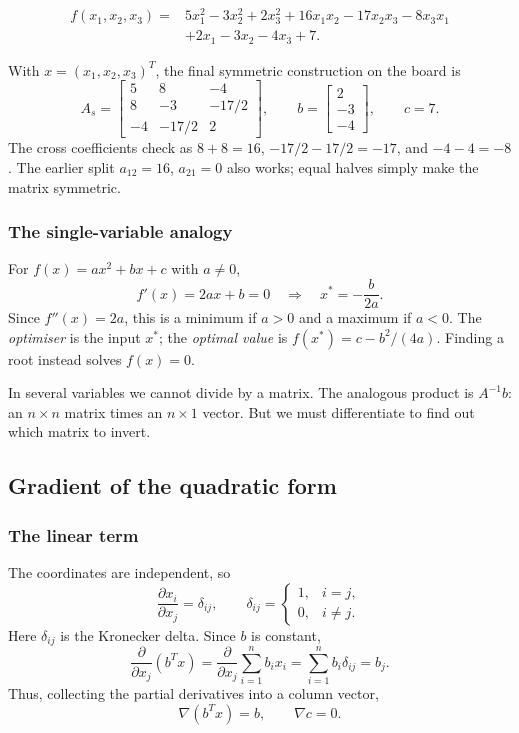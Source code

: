 \begin{example}\label{ex:lec10-three}
	\[
		\begin{aligned}
			f(x_1,x_2,x_3)={} & 5x_1^2-3x_2^2+2x_3^2
			+16x_1x_2-17x_2x_3-8x_3x_1               \\
			                  & +2x_1-3x_2-4x_3+7.
		\end{aligned}
	\]
\end{example}
With $x=(x_1,x_2,x_3)^T$, the final symmetric construction on the board is
\[
	A_s=\begin{bmatrix}
		5 & 8 & -4 \\8&-3&-17/2\\-4&-17/2&2
	\end{bmatrix},\qquad
	b=\begin{bmatrix}2\\-3\\-4\end{bmatrix},\qquad c=7.
\]
The cross coefficients check as $8+8=16$, $-17/2-17/2=-17$, and $-4-4=-8$. The earlier split $a_{12}=16$, $a_{21}=0$ also works; equal halves simply make the matrix symmetric.

\subsubsection*{The single-variable analogy}
For $f(x)=ax^2+bx+c$ with $a\ne0$,
\[
	f'(x)=2ax+b=0\quad\Longrightarrow\quad x^*=-\frac{b}{2a}.
\]
Since $f''(x)=2a$, this is a minimum if $a>0$ and a maximum if $a<0$. The \emph{optimiser} is the input $x^*$; the \emph{optimal value} is $f(x^*)=c-b^2/(4a)$. Finding a root instead solves $f(x)=0$.

In several variables we cannot divide by a matrix. The analogous product is $A^{-1}b$: an $n\times n$ matrix times an $n\times1$ vector. But we must differentiate to find out which matrix to invert.

\clearpage
\subsection{Gradient of the quadratic form}
\subsubsection*{The linear term}
The coordinates are independent, so
\[
	\frac{\partial x_i}{\partial x_j}=\delta_{ij},\qquad
	\delta_{ij}=\begin{cases}1,&i=j,\\0,&i\ne j.\end{cases}
\]
Here $\delta_{ij}$ is the Kronecker delta. Since $b$ is constant,
\[
	\frac{\partial}{\partial x_j}(b^Tx)
	=\frac{\partial}{\partial x_j}\sum_{i=1}^n b_ix_i
	=\sum_{i=1}^n b_i\delta_{ij}=b_j.
\]
Thus, collecting the partial derivatives into a column vector,
\[
	\boxed{\nabla(b^Tx)=b,\qquad \nabla c=0.}
\]

